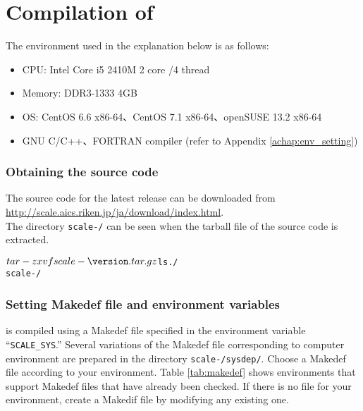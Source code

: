 \section{Compilation of \scalelib} \label{sec:scale_compile}

The environment used in the explanation below is as follows:
\begin{itemize}
\item CPU: Intel Core i5 2410M 2 core /4 thread
\item Memory: DDR3-1333 4GB
\item OS: CentOS 6.6 x86-64、CentOS 7.1 x86-64、openSUSE 13.2 x86-64
\item GNU C/C++、FORTRAN compiler (refer to Appendix \ref{achap:env_setting})
\end{itemize}

\subsubsection{Obtaining the source code} %
The source code for the latest release can be downloaded
from \url{http://scale.aics.riken.jp/ja/download/index.html}.\\
The directory \texttt{scale-{\version}/} can be seen when the tarball file of the source code is extracted.
\begin{alltt}
 $ tar -zxvf scale-{\version}.tar.gz
 $ ls ./
    scale-{\version}/
\end{alltt}

\subsubsection{Setting Makedef file and environment variables} %

\scalelib is compiled using a Makedef file specified in the environment variable ``\verb|SCALE_SYS|.''  Several variations of the Makedef file corresponding to computer environment are prepared in the directory \texttt{scale-{\version}/sysdep/}.  Choose a Makedef file according to your environment. Table \ref{tab:makedef} shows  environments that support Makedef files that have already been checked. If there is no file for your environment,  create a Makedif file by modifying any existing one.

